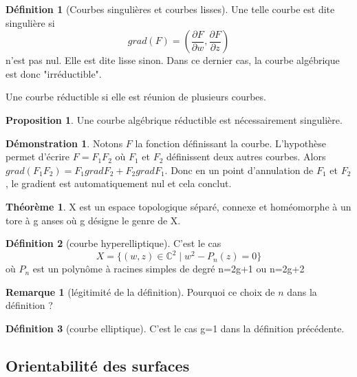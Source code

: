 \documentclass{article}
\newcommand{\C}{\mathbb{C}} %
\theoremstyle{definition} %
\newtheorem{defi}{Définition}
\newtheorem{rmq}{Remarque}
\newtheorem{thm}{Théorème}
\newtheorem{prop}{Proposition}
\newtheorem{dem}{Démonstration}
\newcommand{\1}{\mathbb{1}} %
\begin{document}
\begin{defi}[Courbes singulières et courbes lisses]
Une telle courbe est dite singulière si
$$grad(F)=(\frac{\partial F}{\partial w},\frac{\partial F}{\partial z})$$
n'est pas nul.
Elle est dite lisse sinon.
Dans ce dernier cas, la courbe algébrique est donc "irréductible".
\end{defi}

Une courbe réductible si elle est réunion de plusieurs courbes.




\begin{prop}
Une courbe algébrique réductible est nécessairement singulière.
\end{prop}

\begin{dem}
    Notons $F$ la fonction définissant la courbe.
    L'hypothèse permet d'écrire $F=F_1 F_2$ où $F_1$ et $F_2$ définissent deux autres courbes.
    Alors $grad (F_1 F_2)= F_1 grad F_2 + F_2 grad F_1$.
    Donc en un point d'annulation de $F_1$ et $F_2$, le gradient est automatiquement nul et cela conclut.
\end{dem}





\begin{thm}
X est un espace topologique séparé, connexe et homéomorphe à un tore à g anses où g désigne le genre de X.
\end{thm}

\begin{defi}[courbe hyperelliptique]
C'est le cas
$$X=\{(w,z) \in \C^2 \mid w^2 - P_n(z) = 0\}$$
où $P_n$ est un polynôme à racines simples de degré n=2g+1 ou n=2g+2
\end{defi}

\begin{rmq}[légitimité de la définition]
Pourquoi ce choix de $n$ dans la définition ?
\end{rmq}

\begin{defi}[courbe elliptique]
C'est le cas g=1 dans la définition précédente.
\end{defi}

\subsection{Orientabilité des surfaces}
\end{document}
